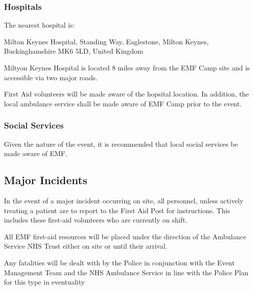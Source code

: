 \subsubsection{Hospitals}

The nearest hospital is:

Milton Keynes Hospital, Standing Way, Eaglestone, Milton Keynes, Buckinghamshire MK6 5LD, United Kingdom

Miltyon Keynes Hospital is located 8 miles away from the EMF Camp site and is accessible via two major roads.

First Aid volunteers will be made aware of the hopsital location. In addition, the local ambulance service shall be made aware of EMF Camp prior to the event.

\subsubsection{Social Services}

Given the nature of the event, it is recommended that local social services be made aware of EMF. 

\subsection{Major Incidents}

In the event of a major incident occurring on site, all personnel, unless actively treating a patient are to report to the First Aid Post for instructions. This includes these first-aid volunteers who are currently on shift.

All EMF first-aid resources will be placed under the direction of the Ambulance Service NHS Trust either on site or until their arrival. 

Any fatalities will be dealt with by the Police in conjunction with the Event Management Team and the NHS Ambulance Service in line with the Police Plan for this type in eventuality
